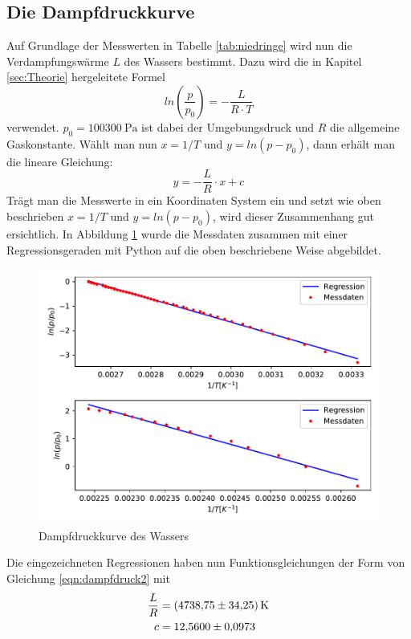 \subsection{Die Dampfdruckkurve}
Auf Grundlage der Messwerten in Tabelle \ref{tab:niedringe} wird nun die Verdampfungswärme $L$ des
Wassers bestimmt. Dazu wird die in Kapitel \ref{sec:Theorie} hergeleitete Formel
\begin{equation}
  ln(\frac{p}{p_0})=-\frac{L}{R\cdot T} \label{eqn:dampfdruck1}
\end{equation}
verwendet. $p_0=\SI{100300}{\pascal}$ ist dabei der Umgebungsdruck und $R$ die allgemeine Gaskonstante.
Wählt man nun $x=1/T$ und $y=ln(p-p_0)$, dann erhält man die lineare Gleichung:
\begin{equation}
  y=-\frac{L}{R}\cdot x+c \label{eqn:dampfdruck2}
\end{equation}
Trägt man die Messwerte in ein Koordinaten System ein und setzt wie oben beschrieben $x=1/T$ und $y=ln(p-p_0)$,
wird dieser Zusammenhang gut ersichtlich. In Abbildung \ref{fig:Dampfdruckkurve} wurde die Messdaten
zusammen mit einer Regressionsgeraden mit Python auf die oben beschriebene Weise abgebildet. 
\begin{figure}
  \centering
  \includegraphics[scale = 0.75]{Auswertung/a.pdf}
  \caption{Dampfdruckkurve des Wassers}
  \label{fig:Dampfdruckkurve}
\end{figure}
Die eingezeichneten Regressionen haben nun Funktionsgleichungen der Form von Gleichung \eqref{eqn:dampfdruck2} mit
\begin{align}
  \frac{L}{R} &= \SI{4738.75 \pm 34.25}{\kelvin} \\
  c           &= \num{12.56 \pm 0.0973} 
\end{align}
